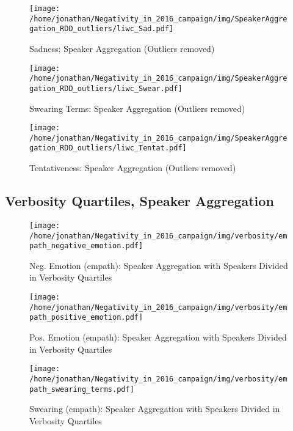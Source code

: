 \begin{figure}[h]\centering
	\texttt{[image: /home/jonathan/Negativity\_in\_2016\_campaign/img/SpeakerAggregation\_RDD\_outliers/liwc\_Sad.pdf]}
	\caption{Sadness: Speaker Aggregation (Outliers removed)}
	\label{fig: sa_Sadness}
\end{figure}

\begin{figure}[h]\centering
	\texttt{[image: /home/jonathan/Negativity\_in\_2016\_campaign/img/SpeakerAggregation\_RDD\_outliers/liwc\_Swear.pdf]}
	\caption{Swearing Terms: Speaker Aggregation (Outliers removed)}
	\label{fig: sa_Swearing Terms}
\end{figure}

\begin{figure}[h]\centering
	\texttt{[image: /home/jonathan/Negativity\_in\_2016\_campaign/img/SpeakerAggregation\_RDD\_outliers/liwc\_Tentat.pdf]}
	\caption{Tentativeness: Speaker Aggregation (Outliers removed)}
	\label{fig: sa_Tentativeness}
\end{figure}

\clearpage
\pagebreak

\subsection{Verbosity Quartiles, Speaker Aggregation}

\begin{figure}[h]\centering
	\texttt{[image: /home/jonathan/Negativity\_in\_2016\_campaign/img/verbosity/empath\_negative\_emotion.pdf]}
	\caption{Neg. Emotion (empath): Speaker Aggregation with Speakers Divided in Verbosity Quartiles}
	\label{fig: verbosity_Neg. Emotion (empath)}
\end{figure}

\begin{figure}[h]\centering
	\texttt{[image: /home/jonathan/Negativity\_in\_2016\_campaign/img/verbosity/empath\_positive\_emotion.pdf]}
	\caption{Pos. Emotion (empath): Speaker Aggregation with Speakers Divided in Verbosity Quartiles}
	\label{fig: verbosity_Pos. Emotion (empath)}
\end{figure}

\begin{figure}[h]\centering
	\texttt{[image: /home/jonathan/Negativity\_in\_2016\_campaign/img/verbosity/empath\_swearing\_terms.pdf]}
	\caption{Swearing (empath): Speaker Aggregation with Speakers Divided in Verbosity Quartiles}
	\label{fig: verbosity_Swearing (empath)}
\end{figure}

